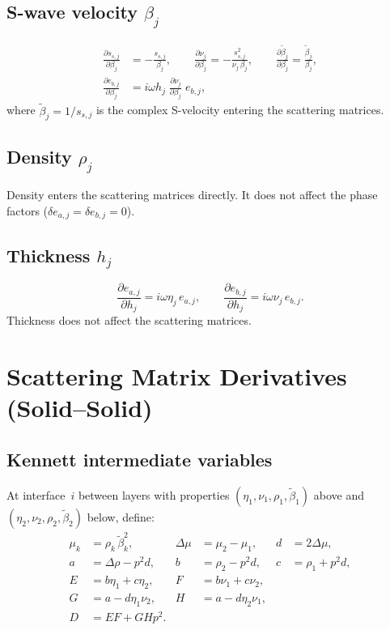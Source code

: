 \documentclass[11pt,a4paper]{article}
\newcommand{\ppd}[2]{\frac{\partial #1}{\partial #2}}
\theoremstyle{plain}
\theoremstyle{remark}
\begin{document}
\subsection{S-wave velocity $\beta_j$}

\begin{align}
  \ppd{s_{s,j}}{\beta_j} &= -\frac{s_{s,j}}{\beta_j},
  \qquad
  \ppd{\nu_j}{\beta_j} = -\frac{s_{s,j}^2}{\nu_j\,\beta_j},
  \qquad
  \ppd{\tilde\beta_j}{\beta_j} = \frac{\tilde\beta_j}{\beta_j},
  \label{eq:dbeta}\\[4pt]
  \ppd{e_{b,j}}{\beta_j}
    &= i\omega h_j\;\ppd{\nu_j}{\beta_j}\;e_{b,j},
  \label{eq:deb-beta}
\end{align}
where $\tilde\beta_j = 1/s_{s,j}$ is the complex S-velocity entering the
scattering matrices.

\subsection{Density $\rho_j$}

Density enters the scattering matrices directly.  It does not affect the phase
factors ($\delta e_{a,j} = \delta e_{b,j} = 0$).

\subsection{Thickness $h_j$}

\begin{equation}\label{eq:dh}
  \ppd{e_{a,j}}{h_j} = i\omega\eta_j\,e_{a,j},
  \qquad
  \ppd{e_{b,j}}{h_j} = i\omega\nu_j\,e_{b,j}.
\end{equation}
Thickness does not affect the scattering matrices.

\section{Scattering Matrix Derivatives (Solid--Solid)}\label{sec:scatmat}

\subsection{Kennett intermediate variables}

At interface~$i$ between layers with properties $(\eta_1,\nu_1,\rho_1,
\tilde\beta_1)$ above and $(\eta_2,\nu_2,\rho_2,\tilde\beta_2)$ below,
define:
\begin{align}
  \mu_k &= \rho_k\,\tilde\beta_k^2, &
  \Delta\mu &= \mu_2 - \mu_1, &
  d &= 2\Delta\mu, \label{eq:mud}\\[4pt]
  a &= \Delta\rho - p^2 d, &
  b &= \rho_2 - p^2 d, &
  c &= \rho_1 + p^2 d, \label{eq:abc}\\[4pt]
  E &= b\eta_1 + c\eta_2, &
  F &= b\nu_1 + c\nu_2, \label{eq:EF}\\[4pt]
  G &= a - d\eta_1\nu_2, &
  H &= a - d\eta_2\nu_1, \label{eq:GH}\\[4pt]
  D &= EF + GHp^2. \label{eq:D}
\end{align}
\end{document}
